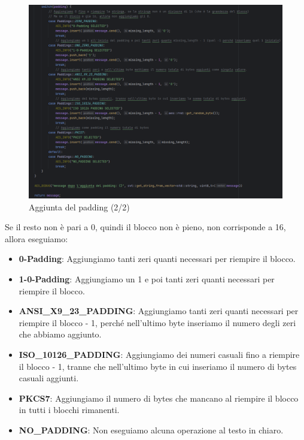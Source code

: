 \begin{figure}[H]
	\centering
	\includegraphics[width=1\textwidth, height=1\textheight, keepaspectratio]{./images/code/cpp/padding/add_padding1.PNG}
	\caption{Aggiunta del padding (2/2)}
	\label{fig:add_padding1}
\end{figure}

\textsf{\small Se il resto non è pari a 0, quindi il blocco non è pieno, non corrisponde a 16, allora eseguiamo:}

\begin{itemize}
	\item \textsf{\small \textbf{0-Padding}: Aggiungiamo tanti zeri quanti necessari per riempire il blocco.}
	\item \textsf{\small \textbf{1-0-Padding}: Aggiungiamo un 1 e poi tanti zeri quanti necessari per riempire il blocco.}
	\item \textsf{\small \textbf{ANSI\_X9\_23\_PADDING}: Aggiungiamo tanti zeri quanti necessari per riempire il blocco - 1, perché nell'ultimo byte inseriamo il numero degli zeri che abbiamo aggiunto.}
	\item \textsf{\small \textbf{ISO\_10126\_PADDING}: Aggiungiamo dei numeri casuali fino a riempire il blocco - 1, tranne che nell'ultimo byte in cui inseriamo il numero di bytes casuali aggiunti.}
	\item \textsf{\small \textbf{PKCS7}: Aggiungiamo il numero di bytes che mancano al riempire il blocco in tutti i blocchi rimanenti.}
	\item \textsf{\small \textbf{NO\_PADDING}: Non eseguiamo alcuna operazione al testo in chiaro.}
\end{itemize}

